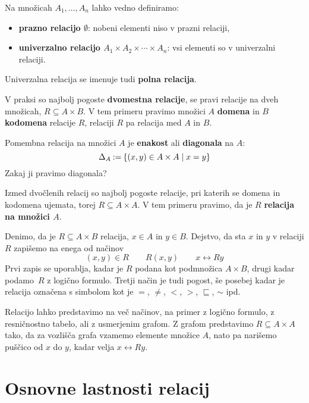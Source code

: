 Na množicah $A_1, \ldots, A_n$ lahko vedno definiramo:
%
\begin{itemize}
\item \textbf{prazno relacijo $\emptyset$}: nobeni elementi niso v prazni relaciji,
\item \textbf{univerzalno relacijo $A_1 \times A_2 \times \cdots \times A_n$}: vsi elementi so v univerzalni relaciji.
\end{itemize}
%
Univerzalna relacija se imenuje tudi \textbf{polna relacija}.

V praksi so najbolj pogoste \textbf{dvomestna relacije}, se pravi relacije na dveh
množicah, $R \subseteq A \times B$.
V tem primeru pravimo množici $A$ \textbf{domena} in $B$ \textbf{kodomena} relacije $R$, relaciji $R$ pa relacija med $A$ in $B$.

Pomembna relacija na množici $A$ je \textbf{enakost} ali \textbf{diagonala} na $A$:
%
\begin{equation*}
    \diag[A] \defeq \set{ (x, y) \in A \times A \such x = y }
\end{equation*}
%
Zakaj ji pravimo diagonala?

Izmed dvočlenih relacij so najbolj pogoste relacije, pri katerih se domena in
kodomena ujemata, torej $R \subseteq A \times A$. V tem primeru pravimo, da je $R$ \textbf{relacija na množici $A$}.

Denimo, da je $R \subseteq A \times B$ relacija, $x \in A$ in $y \in B$. Dejstvo, da sta $x$ in $y$ v relaciji $R$ zapišemo na enega od načinov
%
\begin{equation*}
  (x, y) \in R
  \qquad
  R(x, y)
  \qquad
  x \rel{R} y
\end{equation*}
%
Prvi zapis se uporablja, kadar je $R$ podana kot podmnožica $A \times B$, drugi kadar
podamo~$R$ z logično formulo. Tretji način je tudi pogost, še posebej kadar je
relacija označena s simbolom kot je $=$, $\neq$, $<$, $>$, $\sqsubseteq$, $\sim$ ipd.

Relacijo lahko predstavimo na več načinov, na primer z logično formulo, z resničnostno tabelo, ali z usmerjenim grafom.
%
Z grafom predstavimo $R \subseteq A \times A$ tako, da za vozlišča grafa vzamemo
elemente množice $A$, nato pa narišemo puščico od $x$ do $y$, kadar velja $x \rel{R} y$.


\section{Osnovne lastnosti relacij}

